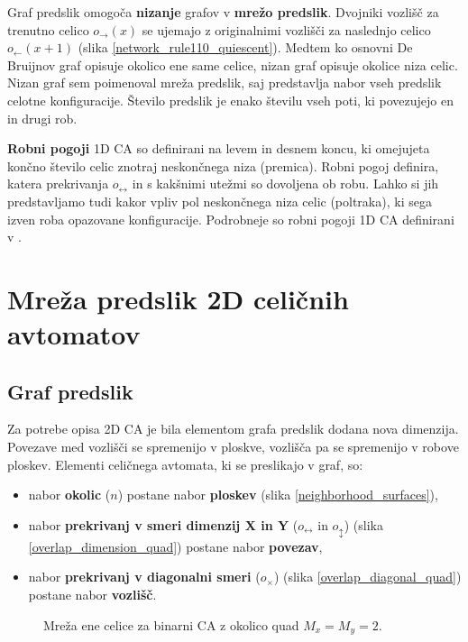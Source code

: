 \documentclass[12pt,a4paper,openany,twoside]{book}
\begin{document}
Graf predslik omogoča \textbf{nizanje} grafov v \textbf{mrežo predslik}.
Dvojniki vozlišč za trenutno celico \(o_{\rightarrow}(x)\) se ujemajo z
originalnimi vozlišči za naslednjo celico \(o_{\leftarrow}(x+1)\) (slika \ref{network_rule110_quiescent}).
Medtem ko osnovni De Bruijnov graf opisuje okolico ene same celice,
nizan graf opisuje okolice niza celic.
Nizan graf sem poimenoval mreža predslik,
saj predstavlja nabor vseh predslik celotne konfiguracije.
Število predslik je enako številu vseh poti,
ki povezujejo en in drugi rob.

\textbf{Robni pogoji} 1D CA so definirani na levem in desnem koncu,
ki omejujeta končno število celic znotraj neskončnega niza (premica).
Robni pogoj definira, katera prekrivanja \(o_{\leftrightarrow}\)
in s kakšnimi utežmi so dovoljena ob robu.
Lahko si jih predstavljamo tudi kakor vpliv pol neskončnega niza celic (poltraka),
ki sega izven roba opazovane konfiguracije.
Podrobneje so robni pogoji 1D CA definirani v \cite{JerasDobnikar2007}.

\section{Mreža predslik 2D celičnih avtomatov}

\subsection{Graf predslik}

Za potrebe opisa 2D CA je bila elementom grafa predslik dodana nova dimenzija.
Povezave med vozlišči se spremenijo v ploskve,
vozlišča pa se spremenijo v robove ploskev.
Elementi celičnega avtomata, ki se preslikajo v graf, so:
\begin{itemize}[noitemsep,nolistsep]
\item nabor \textbf{okolic} (\(n\)) postane nabor \textbf{ploskev} (slika \ref{neighborhood_surfaces}),
\item nabor \textbf{prekrivanj v smeri dimenzij X in Y} (\(o_{\leftrightarrow}\) in \(o_{\updownarrow}\)) (slika \ref{overlap_dimension_quad}) postane nabor \textbf{povezav},
\item nabor \textbf{prekrivanj v diagonalni smeri} (\(o_{\times}\)) (slika \ref{overlap_diagonal_quad}) postane nabor \textbf{vozlišč}.
\end{itemize}

\begin{figure}[htb]
\centerline{}
\caption[Mreža ene celice.]{Mreža ene celice za binarni CA z okolico quad \(M_x=M_y=2\).}
\label{network_single}
\end{figure}
\end{document}
